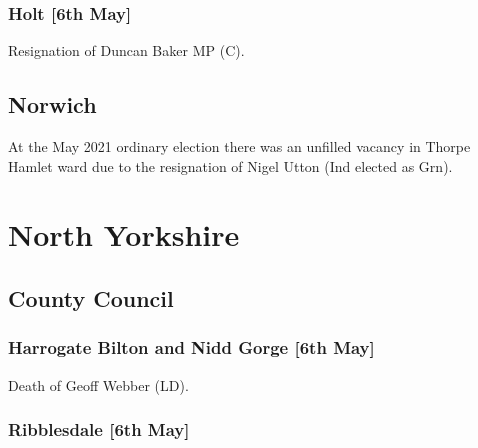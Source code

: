 \documentclass[a4paper,openany]{book}
\begin{document}
\begin{resultsiii}
\subsubsection*{Holt \hspace*{\fill}\nolinebreak[1]%
	\enspace\hspace*{\fill}
	[6th May]}


Resignation of Duncan Baker MP (C).

\subsection*{Norwich}

At the May 2021 ordinary election there was an unfilled vacancy in Thorpe Hamlet ward due to the resignation of Nigel Utton (Ind elected as Grn).

\section{North Yorkshire}

\subsection*{County Council}

\subsubsection*{Harrogate Bilton and Nidd Gorge \hspace*{\fill}\nolinebreak[1]%
	\enspace\hspace*{\fill}
	[6th May]}


Death of Geoff Webber (LD).

\subsubsection*{Ribblesdale \hspace*{\fill}\nolinebreak[1]%
	\enspace\hspace*{\fill}
	[6th May]}



\end{resultsiii}
\end{document}
